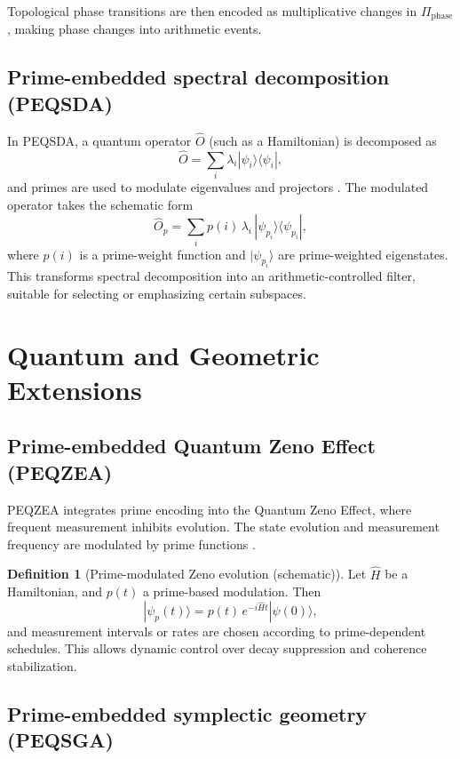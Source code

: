 \documentclass[11pt]{article}
\theoremstyle{definition}
\newtheorem{definition}{Definition}[section]
\theoremstyle{plain}
\theoremstyle{remark}
\begin{document}
Topological phase transitions are then encoded as multiplicative changes in $\Pi_{\text{phase}}$, making phase changes into arithmetic events.

\subsection{Prime-embedded spectral decomposition (PEQSDA)}

In PEQSDA, a quantum operator $\hat{O}$ (such as a Hamiltonian) is decomposed as
\[
\hat{O} = \sum_i \lambda_i |\psi_i\rangle \langle \psi_i|,
\]
and primes are used to modulate eigenvalues and projectors \cite[file:335]{P-SPECTRALDECOMP.pdf}. The modulated operator takes the schematic form
\[
\hat{O}_p = \sum_i p(i)\,\lambda_i\,|\psi_{p_i}\rangle \langle \psi_{p_i}|,
\]
where $p(i)$ is a prime-weight function and $|\psi_{p_i}\rangle$ are prime-weighted eigenstates. This transforms spectral decomposition into an arithmetic-controlled filter, suitable for selecting or emphasizing certain subspaces.

\section{Quantum and Geometric Extensions}

\subsection{Prime-embedded Quantum Zeno Effect (PEQZEA)}

PEQZEA integrates prime encoding into the Quantum Zeno Effect, where frequent measurement inhibits evolution. The state evolution and measurement frequency are modulated by prime functions \cite[file:329]{P-ZENOEFFECT.pdf}.

\begin{definition}[Prime-modulated Zeno evolution (schematic)]
Let $\hat{H}$ be a Hamiltonian, and $p(t)$ a prime-based modulation. Then
\[
|\psi_p(t)\rangle = p(t)\, e^{-i \hat{H} t} |\psi(0)\rangle,
\]
and measurement intervals or rates are chosen according to prime-dependent schedules. This allows dynamic control over decay suppression and coherence stabilization.
\end{definition}

\subsection{Prime-embedded symplectic geometry (PEQSGA)}
\end{document}
